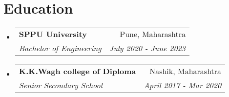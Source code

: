 \documentclass[letterpaper,11pt]{article}
\makeatletter
\newcommand{\resumeItem}[1]{
  \item\small{
    {#1 \vspace{-2pt}}
  }
}
\newcommand{\resumeSubheading}[4]{
  \vspace{-2pt}\item
    \begin{tabular*}{0.97\textwidth}[t]{l@{\extracolsep{\fill}}r}
      \textbf{#1} & #2 \\
      \textit{\small#3} & \textit{\small #4} \\
    \end{tabular*}\vspace{-7pt}
}
\newcommand{\resumeProjectHeading}[2]{
    \item
    \begin{tabular*}{0.97\textwidth}{l@{\extracolsep{\fill}}r}
      \small#1 & #2 \\
    \end{tabular*}\vspace{-7pt}
}
\newcommand{\resumeSubHeadingListStart}{\begin{itemize}[leftmargin=0.15in, label={}]}
\newcommand{\resumeSubHeadingListEnd}{\end{itemize}}
\newcommand{\resumeItemListStart}{\begin{itemize}}
\newcommand{\resumeItemListEnd}{\end{itemize}\vspace{-5pt}}
\makeatother
\begin{document}

\section{Education}
  \resumeSubHeadingListStart
    \resumeSubheading
      {SPPU University}{Pune, Maharashtra}
      {Bachelor of Engineering}{July 2020 - June 2023}
      \resumeSubheading
      {K.K.Wagh college of Diploma}{Nashik, Maharashtra}
      {Senior Secondary School}{April 2017 - Mar 2020}
    
  \resumeSubHeadingListEnd

%
\end{document}
